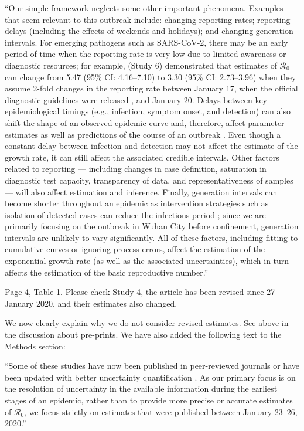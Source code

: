 \documentclass[12pt]{article}
\newcommand{\Ro}{\ensuremath{{\mathcal R}_{0}}\xspace}
\newcommand{\revtext}{\textsf}
\begin{document}
``Our simple framework neglects some other important phenomena.
Examples that seem relevant to this outbreak include: changing reporting rates; reporting delays (including the effects of weekends and holidays); and changing generation intervals.
For emerging pathogens such as SARS-CoV-2, there may be an early period of time when the reporting rate is very low due to limited awareness or diagnostic resources;
for example, \cite{zhaoncov} (Study 6) demonstrated that estimates of \Ro can change from 5.47 (95\% CI: 4.16--7.10) to 3.30 (95\% CI: 2.73--3.96) when they assume 2-fold changes in the reporting rate between January 17, when the official diagnostic guidelines were released \citep{who17protocol}, and January 20.
Delays between key epidemiological timings (e.g., infection, symptom onset, and detection) can also shift the shape of an observed epidemic curve and, therefore, affect parameter estimates as well as predictions of the course of an outbreak \citep{tariq2019assessing}.
Even though a constant delay between infection and detection may not affect the estimate of the growth rate, it can still affect the associated credible intervals.
Other factors related to reporting --- including changes in case definition, saturation in diagnostic test capacity, transparency of data, and representativeness of samples --- will also affect estimation and inference.
Finally, generation intervals can become shorter throughout an epidemic as intervention strategies such as isolation of detected cases can reduce the infectious period \citep{hethcote2002effects};
since we are primarily focusing on the outbreak in Wuhan City before confinement, generation intervals are unlikely to vary significantly.
All of these factors, including fitting to cumulative curves or ignoring process errors, affect the estimation of the exponential growth rate (as well as the associated uncertainties), which in turn affects the estimation of the basic reproductive number.''

\revtext{Page 4, Table 1. Please check Study 4, the article has been revised since 27 January 2020,
and their estimates also changed.}

We now clearly explain why we do not consider revised estimates. See above in the discussion about pre-prints. We have also added the following text to the Methods section:

``Some of these studies have now been published in peer-reviewed journals \citep{riou2020pattern, zhao2020preliminary} or have been updated with better uncertainty quantification \citep{readncov2}.
As our primary focus is on the resolution of uncertainty in the available information during the earliest stages of an epidemic, rather than to provide more precise or accurate estimates of \Ro, we focus strictly on estimates that were published between January 23--26, 2020.''
\end{document}
